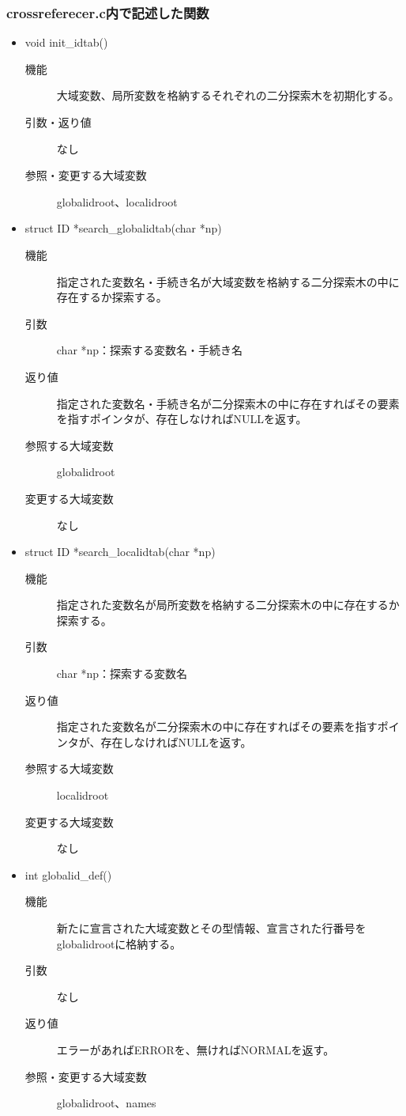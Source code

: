\documentclass{jarticle}
\begin{document}
\subsubsection{crossreferecer.c内で記述した関数}
\begin{itemize}
  \item void init\_idtab()
  \begin{description}
\item[機能]大域変数、局所変数を格納するそれぞれの二分探索木を初期化する。
\item[引数・返り値]なし
\item[参照・変更する大域変数]globalidroot、localidroot
\end{description}
\item struct ID *search\_globalidtab(char *np)
\begin{description}
\item[機能]指定された変数名・手続き名が大域変数を格納する二分探索木の中に存在するか探索する。
\item[引数]char *np：探索する変数名・手続き名
\item[返り値]指定された変数名・手続き名が二分探索木の中に存在すればその要素を指すポインタが、存在しなければNULLを返す。
\item[参照する大域変数]globalidroot
\item[変更する大域変数]なし
\end{description}
\item struct ID *search\_localidtab(char *np)
\begin{description}
\item[機能]指定された変数名が局所変数を格納する二分探索木の中に存在するか探索する。
\item[引数]char *np：探索する変数名
\item[返り値]指定された変数名が二分探索木の中に存在すればその要素を指すポインタが、存在しなければNULLを返す。
\item[参照する大域変数]localidroot
\item[変更する大域変数]なし
\end{description}
\item int globalid\_def()
\begin{description}
\item[機能]新たに宣言された大域変数とその型情報、宣言された行番号をglobalidrootに格納する。
\item[引数]なし
\item[返り値]エラーがあればERRORを、無ければNORMALを返す。
\item[参照・変更する大域変数]globalidroot、names

\end{description}
\end{itemize}
\end{document}
